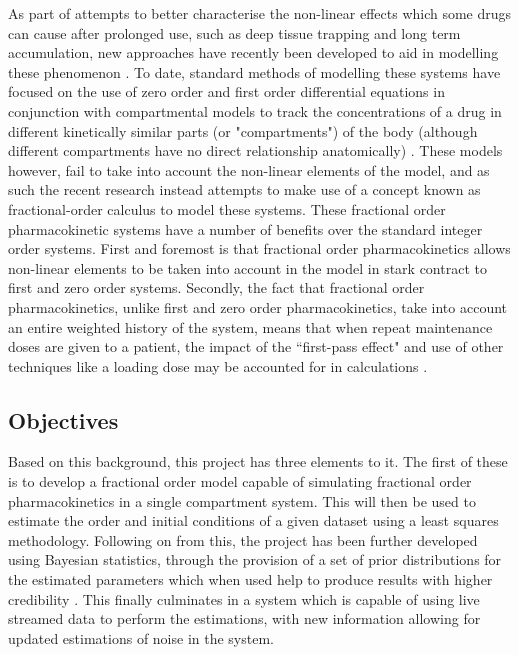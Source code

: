 As part of attempts to better characterise the non-linear effects which some drugs can cause after prolonged use, such as deep tissue trapping and long term accumulation, new approaches have recently been developed to aid in modelling these phenomenon \cite{ion_trapping, cumlative_effects}. To date, standard methods of modelling these systems have focused on the use of zero order and first order differential equations \cite{Clinical_Pharmacokinetics_and_Pharmacodynamics_Concepts} in conjunction with compartmental models to track the concentrations of a drug in different kinetically similar parts (or "compartments") of the body (although different compartments have no direct relationship anatomically) \cite{Compartmental_modeling_in_Pharmacokinetics}. These models however, fail to take into account the non-linear elements of the model, and as such the recent research instead attempts to make use of a concept known as fractional-order calculus to model these systems. These fractional order pharmacokinetic systems have a number of benefits over the standard integer order systems. First and foremost is that fractional order pharmacokinetics allows non-linear elements to be taken into account in the model in stark contract to first and zero order systems. Secondly, the fact that fractional order pharmacokinetics, unlike first and zero order pharmacokinetics, take into account an entire weighted history of the system, means that when repeat maintenance doses are given to a patient, the impact of the ``first-pass effect" and use of other techniques like a loading dose may be accounted for in calculations \cite{Clinical_Pharmacokinetics_and_Pharmacodynamics_Concepts}. 

\subsection{Objectives} \label{objectives}

Based on this background, this project has three elements to it. The first of these is to develop a fractional order model capable of simulating fractional order pharmacokinetics in a single compartment system. This will then be used to estimate the order and initial conditions of a given dataset using a least squares methodology. Following on from this, the project has been further developed using Bayesian statistics, through the provision of a set of prior distributions for the estimated parameters which when used help to produce results with higher credibility \cite{statistical_rethinking}. This finally culminates in a system which is capable of using live streamed data to perform the estimations, with new information allowing for updated estimations of noise in the system. 

